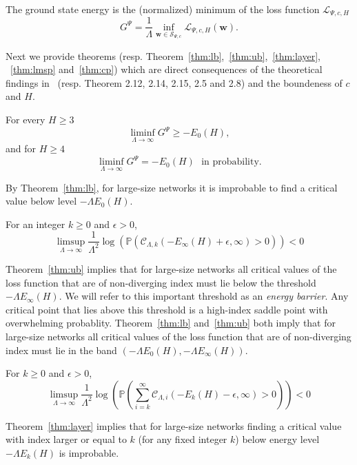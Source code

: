 \documentclass[twoside]{article}
\begin{document}
\begin{definition}
The ground state energy is the (normalized) minimum of the loss function $\mathcal{L}_{\Psi,c,H}$
\[G^\Psi = \frac{1}{\Lambda}\inf_{{\bm w}\in \mathcal{S}_{\Psi,c}}\mathcal{L}_{\Psi,c,H}({\bm w}).
\]
\end{definition}
Next we provide theorems (resp. Theorem~\ref{thm:lb},~\ref{thm:ub},~\ref{thm:layer}, ~\ref{thm:lmsp} and~\ref{thm:cp}) which are direct consequences of the theoretical findings in~\cite{AAC2010} (resp. Theorem 2.12, 2.14, 2.15, 2.5 and 2.8)  and the boundeness of $c$ and $H$.  

\begin{theorem}
For every $H \geq 3$
\[\liminf_{\Lambda \rightarrow \infty} G^\Psi \geq -E_0(H),
\]
and for $H \geq 4$
\[\liminf_{\Lambda \rightarrow \infty} G^\Psi = -E_0(H) \:\:\:\text{in probability.}
\]
\label{thm:lb}
\end{theorem}
By Theorem~\ref{thm:lb}, for large-size networks it is improbable to find a critical value below level $-\Lambda E_0(H)$.
\begin{theorem}
For an integer $k \geq 0$ and $\epsilon > 0$,
\[\limsup_{\Lambda \rightarrow \infty} \frac{1}{\Lambda^2}\log(\mathbb{P}(\mathcal{C}_{\Lambda,k}(-E_{\infty}(H) + \epsilon,\infty)>0)) < 0
\]
\label{thm:ub}
\end{theorem}
Theorem~\ref{thm:ub} implies that for large-size networks all critical values of the loss function that are of non-diverging index must lie below the threshold $-\Lambda E_{\infty}(H)$. We will refer to this important threshold as an \textit{energy barrier}. Any critical point that lies above this threshold is a high-index saddle point with overwhelming probablity. Theorem~\ref{thm:lb} and~\ref{thm:ub} both imply that for large-size networks all critical values of the loss function that are of non-diverging index must lie in the band $\left(-\Lambda E_0(H),-\Lambda E_{\infty}(H)\right)$.
\begin{theorem}
For $k \geq 0$ and $\epsilon > 0$,
\[\limsup_{\Lambda \rightarrow \infty} \frac{1}{\Lambda^2}\log(\mathbb{P}(\sum_{i=k}^{\infty}\!\mathcal{C}_{\Lambda,i}(-E_k(H) - \epsilon,\infty) \!>\! 0)) \!<\! 0
\]
\label{thm:layer}
\end{theorem}
Theorem~\ref{thm:layer} implies that for large-size networks finding a critical value with index larger or equal to $k$ (for any fixed integer $k$) below energy level $-\Lambda E_k(H)$ is improbable. 
\end{document}
